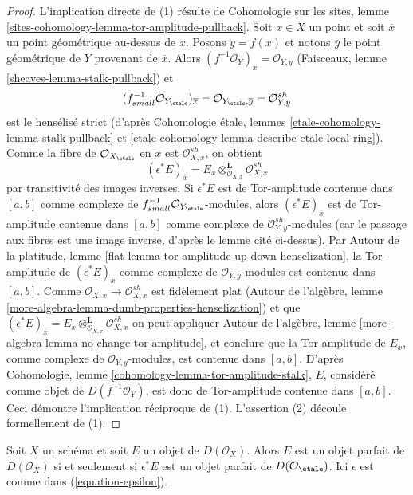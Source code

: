 \begin{proof}
L'implication directe de (1) r\'esulte de Cohomologie sur les sites, lemme
\ref{sites-cohomology-lemma-tor-amplitude-pullback}.
Soit $x \in X$ un point et soit $\overline{x}$ un point g\'eom\'etrique
au-dessus de $x$. Posons $y=f(x)$ et notons $\overline{y}$ le point
g\'eom\'etrique de $Y$ provenant de $\overline{x}$. Alors
$(f^{-1}\mathcal{O}_Y)_x = \mathcal{O}_{Y,y}$ (Faisceaux, lemme
\ref{sheaves-lemma-stalk-pullback}) et
$$
(f_{small}^{-1}\mathcal{O}_{Y_\etale})_{\overline{x}} =
\mathcal{O}_{Y_\etale, \overline{y}} =
\mathcal{O}_{Y, y}^{sh}
$$
est le hens\'elis\'e strict (d'apr\`es Cohomologie \'etale, lemmes
\ref{etale-cohomology-lemma-stalk-pullback} et
\ref{etale-cohomology-lemma-describe-etale-local-ring}).
Comme la fibre de $\mathcal{O}_{X_\etale}$ en $\overline{x}$ est
$\mathcal{O}_{X,x}^{sh}$, on obtient
$$
(\epsilon^*E)_{\overline{x}} =
E_x \otimes_{\mathcal{O}_{X, x}}^\mathbf{L} \mathcal{O}_{X, x}^{sh}
$$
par transitivit\'e des images inverses. Si $\epsilon^*E$ est de Tor-amplitude
contenue dans $[a,b]$ comme complexe de
$f_{small}^{-1}\mathcal{O}_{Y_\etale}$-modules, alors
$(\epsilon^*E)_{\overline{x}}$ est de Tor-amplitude contenue dans $[a,b]$
comme
complexe de $\mathcal{O}_{Y,y}^{sh}$-modules (car le passage aux fibres est
une image inverse, d'apr\`es le lemme cit\'e ci-dessus). Par Autour de la
platitude, lemme \ref{flat-lemma-tor-amplitude-up-down-henselization},
la Tor-amplitude de
$(\epsilon^*E)_{\overline{x}}$
comme complexe de $\mathcal{O}_{Y,y}$-modules est contenue dans $[a,b]$.
Comme $\mathcal{O}_{X,x} \to \mathcal{O}_{X,x}^{sh}$ est fid\`element plat
(Autour de l'alg\`ebre, lemme
\ref{more-algebra-lemma-dumb-properties-henselization}) et que
$(\epsilon^*E)_{\overline{x}} =
E_x \otimes_{\mathcal{O}_{X, x}}^\mathbf{L} \mathcal{O}_{X, x}^{sh}$
on peut appliquer Autour de l'alg\`ebre, lemme
\ref{more-algebra-lemma-no-change-tor-amplitude}, et conclure que la
Tor-amplitude de $E_x$, comme complexe de
$\mathcal{O}_{Y,y}$-modules, est contenue
dans $[a,b]$. D'apr\`es Cohomologie, lemme
\ref{cohomology-lemma-tor-amplitude-stalk}, $E$, consid\'er\'e comme objet de
$D(f^{-1}\mathcal{O}_Y)$, est donc de Tor-amplitude contenue dans $[a,b]$.
Ceci d\'emontre l'implication r\'eciproque de (1). L'assertion (2) d\'ecoule
formellement de (1).
\end{proof}

\begin{lemma}
\label{lemma-descend-perfect}
Soit $X$ un sch\'ema et soit $E$ un objet de $D(\mathcal{O}_X)$. Alors $E$ est
un objet parfait de $D(\mathcal{O}_X)$ si et seulement si $\epsilon^*E$ est
un objet parfait de $D(\mathcal{O}_\etale)$. Ici $\epsilon$ est comme dans
(\ref{equation-epsilon}).
\end{lemma}

